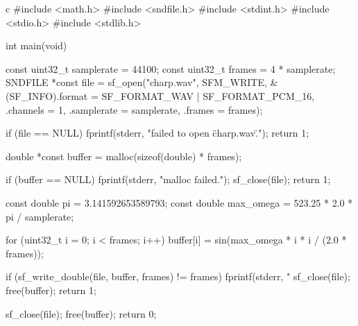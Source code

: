 \documentclass[../../main]{subfiles}
\begin{document}
\begin{codeblock}{c}
#include <math.h>
#include <sndfile.h>
#include <stdint.h>
#include <stdio.h>
#include <stdlib.h>

int main(void) {
  const uint32_t samplerate = 44100;
  const uint32_t frames = 4 * samplerate;
  SNDFILE *const file =
      sf_open("charp.wav", SFM_WRITE,
              &(SF_INFO){.format = SF_FORMAT_WAV | SF_FORMAT_PCM_16,
                         .channels = 1,
                         .samplerate = samplerate,
                         .frames = frames});

  if (file == NULL) {
    fprintf(stderr, "failed to open \"charp.wav\".\n");
    return 1;
  }

  double *const buffer = malloc(sizeof(double) * frames);

  if (buffer == NULL) {
    fprintf(stderr, "malloc failed.\n");
    sf_close(file);
    return 1;
  }

  const double pi = 3.141592653589793;
  const double max_omega = 523.25 * 2.0 * pi / samplerate;

  for (uint32_t i = 0; i < frames; i++) {
    buffer[i] = sin(max_omega * i * i / (2.0 * frames));
  }

  if (sf_write_double(file, buffer, frames) != frames) {
    fprintf(stderr, "%
    sf_close(file);
    free(buffer);
    return 1;
  }

  sf_close(file);
  free(buffer);
  return 0;
}
\end{codeblock}
\end{document}
